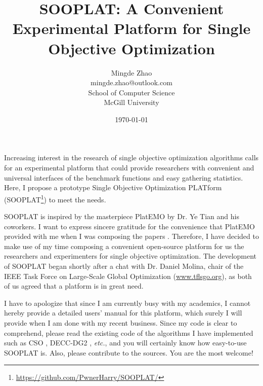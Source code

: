 \documentclass{article}
\newcommand\etc{\textit{etc.}}
\theoremstyle{definition}
\begin{document}
\title{SOOPLAT: A Convenient Experimental Platform for Single Objective Optimization}

\author{Mingde Zhao\\
mingde.zhao@outlook.com\\
School of Computer Science\\
McGill University}


\date{\today}
\maketitle

Increasing interest in the research of single objective optimization algorithms calls for an experimental platform that could provide researchers with convenient and universal interfaces of the benchmark functions and easy gathering statistics. Here, I propose a prototype Single Objective Optimization PLATform (SOOPLAT\footnote{\url{https://github.com/PwnerHarry/SOOPLAT/}}) to meet the needs.
\par
SOOPLAT is inspired by the masterpiece PlatEMO \cite{tian2017platemo} by Dr. Ye Tian and his coworkers. I want to express sincere gratitude for the convenience that PlatEMO provided with me when I was composing the papers \cite{gezhao2018interacting, zhaoge2018fast}. Therefore, I have decided to make use of my time composing a convenient open-source platform for us the researchers and experimenters for single objective optimization. The development of SOOPLAT began shortly after a chat with Dr. Daniel Molina, chair of the IEEE Task Force on Large-Scale Global Optimization (\url{www.tflsgo.org}), as both of us agreed that a platform is in great need.
\par
I have to apologize that since I am currently busy with my academics, I cannot hereby provide a detailed users' manual for this platform, which surely I will provide when I am done with my recent business. Since my code is clear to comprehend, please read the existing code of the algorithms I have implemented such as CSO \cite{cheng2015competitive}, DECC-DG2 \cite{omidvar2017faster}, \etc{}, and you will certainly know how easy-to-use SOOPLAT is. Also, please contribute to the sources. You are the most welcome!



\end{document}
